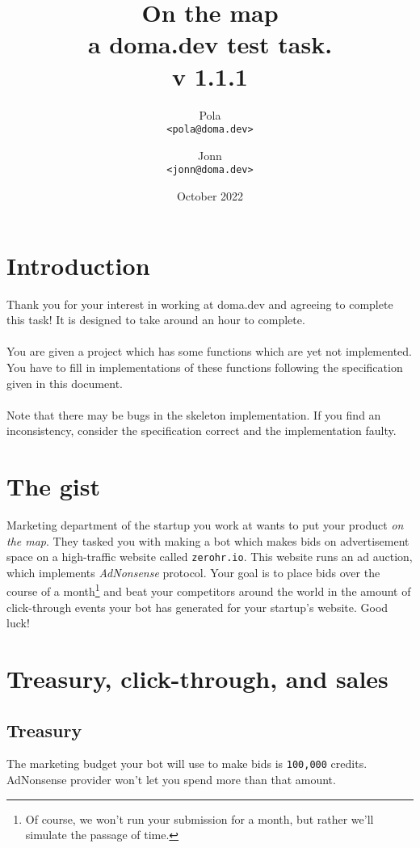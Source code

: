 \documentclass{article}
\title{%
    On the map \\
    \large a doma.dev test task. \\ v 1.1.1
}
\author{Pola \\ \texttt{<pola@doma.dev>} \and Jonn \\ \texttt{<jonn@doma.dev>}}
\date{October 2022}
\begin{document}
\maketitle

\section{Introduction}

Thank you for your interest in working at doma.dev and agreeing to complete this task!
It is designed to take around an hour to complete.
\\ \\
You are given a project which has some functions which are yet not implemented. You have to fill in implementations of these functions following the specification given in this document.
\\ \\
Note that there may be bugs in the skeleton implementation. If you find an inconsistency, consider the specification correct and the implementation faulty.

\section{The gist}

Marketing department of the startup you work at wants to put your product \emph{on the map}. They tasked you with making a bot which makes bids on advertisement space on a high-traffic website called \texttt{zerohr.io}. This website runs an ad auction, which implements \emph{AdNonsense} protocol. Your goal is to place bids over the course of a month\footnote{Of course, we won't run your submission for a month, but rather we'll simulate the passage of time.} and beat your competitors around the world in the amount of click-through events your bot has generated for your startup's website. Good luck!

\pagebreak

\section{Treasury, click-through, and sales}

\subsection{Treasury}
The marketing budget your bot will use to make bids is \texttt{100,000} credits. AdNonsense provider won't let you spend more than that amount.
\end{document}
